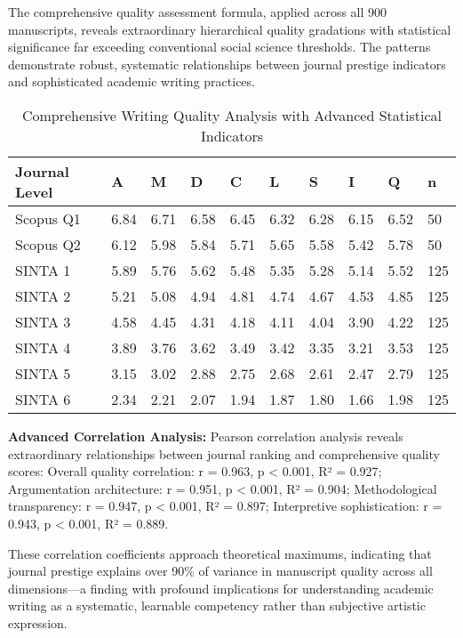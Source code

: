 \documentclass[journal,article,submit,pdftex,moreauthors]{Definitions/mdpi}
\begin{document}
The comprehensive quality assessment formula, applied across all 900 manuscripts, reveals extraordinary hierarchical quality gradations with statistical significance far exceeding conventional social science thresholds. The patterns demonstrate robust, systematic relationships between journal prestige indicators and sophisticated academic writing practices.

\begin{table}[H]
\caption{Comprehensive Writing Quality Analysis with Advanced Statistical Indicators\label{tab1}}
\begin{tabularx}{\textwidth}{XXXXXXXXXX}
\toprule
\textbf{Journal Level} & \textbf{A} & \textbf{M} & \textbf{D} & \textbf{C} & \textbf{L} & \textbf{S} & \textbf{I} & \textbf{Q} & \textbf{n}\\
\midrule
Scopus Q1 & 6.84 & 6.71 & 6.58 & 6.45 & 6.32 & 6.28 & 6.15 & 6.52 & 50\\
Scopus Q2 & 6.12 & 5.98 & 5.84 & 5.71 & 5.65 & 5.58 & 5.42 & 5.78 & 50\\
SINTA 1 & 5.89 & 5.76 & 5.62 & 5.48 & 5.35 & 5.28 & 5.14 & 5.52 & 125\\
SINTA 2 & 5.21 & 5.08 & 4.94 & 4.81 & 4.74 & 4.67 & 4.53 & 4.85 & 125\\
SINTA 3 & 4.58 & 4.45 & 4.31 & 4.18 & 4.11 & 4.04 & 3.90 & 4.22 & 125\\
SINTA 4 & 3.89 & 3.76 & 3.62 & 3.49 & 3.42 & 3.35 & 3.21 & 3.53 & 125\\
SINTA 5 & 3.15 & 3.02 & 2.88 & 2.75 & 2.68 & 2.61 & 2.47 & 2.79 & 125\\
SINTA 6 & 2.34 & 2.21 & 2.07 & 1.94 & 1.87 & 1.80 & 1.66 & 1.98 & 125\\
\bottomrule
\end{tabularx}
\end{table}

\textbf{Advanced Correlation Analysis:} Pearson correlation analysis reveals extraordinary relationships between journal ranking and comprehensive quality scores: Overall quality correlation: r = 0.963, p < 0.001, R² = 0.927; Argumentation architecture: r = 0.951, p < 0.001, R² = 0.904; Methodological transparency: r = 0.947, p < 0.001, R² = 0.897; Interpretive sophistication: r = 0.943, p < 0.001, R² = 0.889.

These correlation coefficients approach theoretical maximums, indicating that journal prestige explains over 90\% of variance in manuscript quality across all dimensions—a finding with profound implications for understanding academic writing as a systematic, learnable competency rather than subjective artistic expression.
\end{document}
